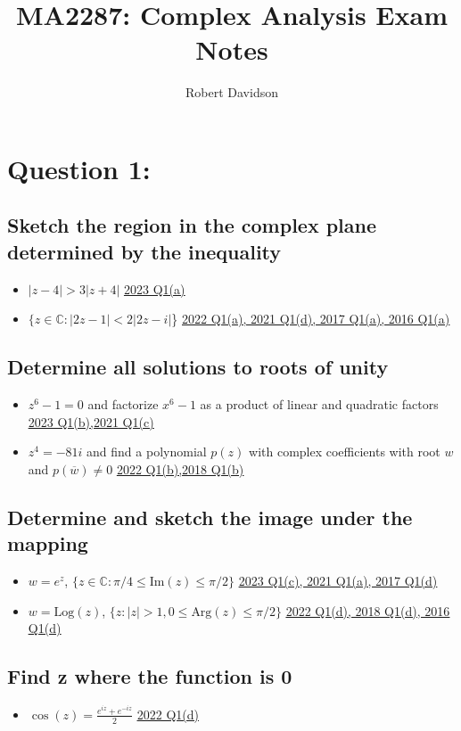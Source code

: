 \documentclass[a4paper, 8pt]{extarticle}
\title{
\textbf{MA2287: Complex Analysis Exam Notes} \\ 
}
\author{
  Robert Davidson
}
\date{} %
\begin{document}
\maketitle
\pagebreak
\tableofcontents
\pagebreak


\section{Question 1: }
\subsection{Sketch the region in the complex plane determined by the inequality}
\begin{itemize}
	\item $|z - 4| > 3|z+4|$ \hfill \hyperref[sol:2023Q1a]{\uline{2023 Q1(a)}}
	\item $\{ z \in \mathbb{C} : |2z - 1| < 2|2z-i|$\} \hfill  \hyperref[sol:2022Q1a]{\uline{2022 Q1(a), 2021 Q1(d), 2017 Q1(a), 2016 Q1(a)}}
\end{itemize}
\subsection{Determine all solutions to roots of unity}
\begin{itemize}
	\item $z^6 -1 = 0$ and factorize $x^6 -1$ as a product of linear and quadratic factors \hfill \hyperref[sol:2023Q1b]{\uline{2023 Q1(b),2021 Q1(c)}}
	\item $z^4 = -81i$ and find a polynomial $p(z)$ with complex coefficients with root $w$ and $p(\overline{w}) \neq 0$ \hfill \hyperref[sol:20188Q1b]{\uline{2022 Q1(b),2018 Q1(b)}}

\end{itemize}
\subsection{Determine and sketch the image under the mapping}
\begin{itemize}
	\item $w = e^z$, $\{z \in \mathbb{C} : \pi / 4 \leq \text{Im}(z) \leq \pi /2\}$ \hfill \hyperref[sol:2023Q1c]{\uline{2023 Q1(c), 2021 Q1(a), 2017 Q1(d)}}
	\item $w = \text{Log}(z)$, $\{z: |z| > 1, 0 \leq \text{Arg}(z) \leq \pi / 2\}$  \hfill \hyperref[sol:2022Q1d]{\uline{2022 Q1(d), 2018 Q1(d), 2016 Q1(d)}}
\end{itemize}
\subsection{Find z where the function is 0}
\begin{itemize}
	\item $\cos(z) = \frac{e^{iz} + e^{-iz}}{2}$ \hfill \hyperref[sol:2023Q1d]{\uline{2022 Q1(d)}}
\end{itemize}
\end{document}
